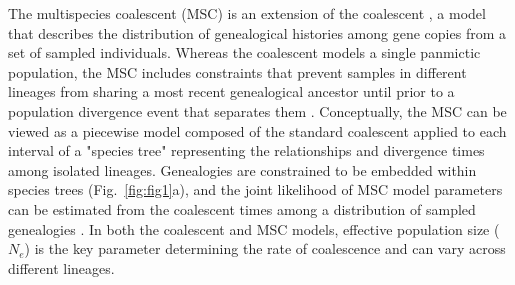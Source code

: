 \documentclass[11pt]{article}
\begin{document}
The multispecies coalescent (MSC) is an extension of the coalescent 
\citep{kingman1982coalescent}, a model that describes the distribution of genealogical 
histories among gene copies from a set of sampled individuals. Whereas the 
coalescent models a single panmictic population, the MSC includes constraints that prevent 
samples in different lineages from sharing a most recent genealogical ancestor until prior
to a population divergence event that separates them \citep{maddison1997gene,maddison2006inferring}. 
Conceptually, the MSC can be viewed as a piecewise model composed of the standard
coalescent applied to each interval of a "species tree" representing the relationships
and divergence times among isolated lineages. Genealogies are constrained to be
embedded within species trees (Fig.~\ref{fig:fig1}a), and the joint likelihood of 
MSC model parameters can be estimated from the coalescent times among a 
distribution of sampled genealogies
% 
\citep{rannala2003bayes,degnan2009gene}. In both the coalescent
and MSC models, effective population size ($N_e$) is the key parameter determining 
the rate of coalescence and can vary across different lineages. 

\end{document}
